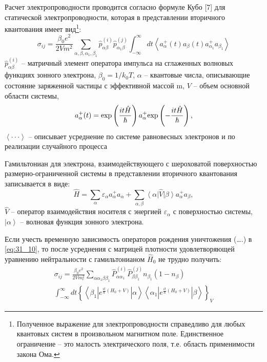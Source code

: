 Расчет электропроводности проводится согласно формуле Кубо \cite{Kubo1957a}[7] для статической электропроводности, которая в представлении вторичного квантования имеет вид\footnote{ Полученное выражение для электропроводности справедливо для любых квантовых систем в произвольном магнитном поле. Единственное ограничение -- это малость электрического поля, т.е. область применимости закона Ома.}:
\begin{equation} \label{eq:31_10}
\sigma _{ij} =\frac{\beta _{0} e^{2} }{2Vm^{2} } \sum _{\alpha ,\beta ,\alpha _{1} ,\beta _{1} }\hat{p}_{\alpha \beta }^{(i)} \hat{p}_{\alpha _{1} \beta }^{(j)} \int _{-\infty }^{\infty }dt\left\langle a_{\alpha }^{+} (t)a_{\beta } (t)a_{\alpha _{1} }^{+} a_{\beta _{1} } \right\rangle
\end{equation} 
$\hat{p}_{\alpha \beta }^{(i)} $ -- матричный элемент оператора импульса на сглаженных волновых функциях зонного электрона, $\beta _{0} =1/k_{0} T$, $\alpha $ -- квантовые числа, описывающие состояние заряженной частицы с эффективной массой m, $V$ -- объем основной области системы,
\[
a_{\alpha }^{+} (t)={\rm exp}\left(\frac{it\hat{H}}{\hbar } \right)a_{\alpha }^{+} {\rm exp}\left(-\frac{it\hat{H}}{\hbar } \right),
\] 
$\left\langle \cdot \cdot \cdot \right\rangle $ -- описывает усреднение по системе равновесных электронов и по реализации случайного процесса

Гамильтониан для электрона, взаимодействующего с шероховатой поверхностью размерно-ограниченной системы в представлении вторичного квантования записывается в виде:
\begin{equation} \label{eq:31_20}
\hat{H}=\sum _{\alpha }\varepsilon _{\alpha } a_{\alpha }^{+} a_{\alpha } +\sum _{\alpha ,\beta }{\left\langle \alpha  \right|} \hat{V}{\left| \beta  \right\rangle} a_{\alpha }^{+} a_{\beta }, 
\end{equation}
$\hat{V}$ -- оператор взаимодействия носителя с энергией $\varepsilon _{\alpha } $ с поверхностью системы, ${\left| \alpha  \right\rangle} $ -- волновая функция зонного электрона.

Если учесть временную зависимость операторов рождения уничтожения (\dots .) в \eqref{eq:31_10}, то после усреднения с матрицей плотности удовлетворяющей уравнению нейтральности с гамильтонианом ${\hat{H}}_0$ не трудно получить:
\begin{multline} \label{eq:31_30}
{\sigma }_{ij}=\frac{{\beta }_0 e^2}{2Vm^2_e}\sum_{\alpha \alpha _1\beta \beta_1}{{\hat{P}}^{\left(i\right)}_{\alpha {\alpha }_1}{\hat{P}}^{\left(j\right)}_{\beta {\beta }_1}n_{{\beta }_1}\left(1-n_{\beta }\right)}\\
\int^{\infty }_{-\infty }{d t {\left\{\left\langle {\beta }_1\left|e^{\frac{it}{\hbar }\left(H_0+V\right)}\right|\alpha \right\rangle \left\langle {\alpha }_1\left|e^{\frac{i t}{\hbar }\left(H_0+V\right)}\right|\beta \right\rangle \right\}}_V}
\end{multline}

